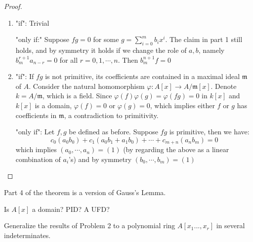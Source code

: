 \documentclass{solution}
\begin{document}
\begin{proof}
\begin{enumerate}
        \item "if": Trivial

        "only if:" Suppose $fg = 0$ for some $g = \sum\limits_{i = 0}^{m} b_i x^i$. The claim in part 1 still holds, and by symmetry it holds if we change the role of $a, b$, namely $b_m^{r + 1} a_{n - r} = 0$ for all $r = 0, 1, \cdots, n$. Then $b_m^{n + 1} f = 0$ \TODO

        \item "if": If $fg$ is not primitive, its coefficients are contained in a maximal ideal $\mathfrak{m}$ of $A$. Consider the natural homomorphism $\varphi: A[x] \rightarrow A / \mathfrak{m}[x]$. Denote $k = A / \mathfrak{m}$, which is a field. Since $\varphi(f)\varphi(g) = \varphi(fg) = 0$ in $k[x]$ and $k[x]$ is a domain, $\varphi(f) = 0$ or $\varphi(g) = 0$, which implies either $f$ or $g$ has coefficients in $\mathfrak{m}$, a contradiction to primitivity.
        
        "only if": Let $f, g$ be defined as before. Suppose $fg$ is primitive, then we have:
        $$c_0(a_0b_0) + c_1(a_0b_1 + a_1b_0) + \cdots + c_{m + n} (a_nb_m) = 0$$
        which implies $(a_0, \cdots, a_n) = (1)$ (by regarding the above as a linear combination of $a_i$'s) and by symmetry $(b_0, \cdots, b_m) = (1)$
    \end{enumerate}
\end{proof}

\begin{remark}
    Part 4 of the theorem is a version of Gauss's Lemma.
\end{remark}

\TODO Is $A[x]$ a domain? PID? A UFD?

\begin{problem}{3}
    Generalize the results of Problem 2 to a polynomial ring $A[x_1 ... , x_r]$ in several indeterminates.
\end{problem}
\end{document}
